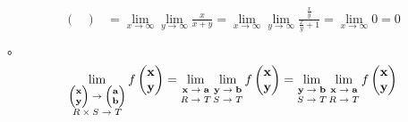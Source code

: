 \documentclass[dvipdfmx]{jsarticle}
\begin{document}
\begin{thm}
{\begin{align*}
\begin{pmatrix}
  \end{pmatrix} &= \lim_{x\rightarrow \infty } \lim_{y\rightarrow \infty } \frac{x}{x+y} = \lim_{x\rightarrow \infty } \lim_{y\rightarrow \infty } \frac{\frac{x}{y}}{\frac{x}{y}+1} = \lim_{x\rightarrow \infty } 0 =0 \\
\end{align*}}。
\begin{align*}
\lim_{\scriptsize \begin{matrix} \begin{pmatrix}
\mathbf{x} \\
\mathbf{y} \\
\end{pmatrix} \rightarrow \begin{pmatrix}
\mathbf{a} \\
\mathbf{b} \\
\end{pmatrix} \\ R \times S \rightarrow T \end{matrix}}{f\begin{pmatrix}
\mathbf{x} \\
\mathbf{y} \\
\end{pmatrix}} = \lim_{\scriptsize \begin{matrix} \mathbf{x} \rightarrow \mathbf{a} \\ R \rightarrow T \end{matrix}}{\lim_{\scriptsize \begin{matrix} \mathbf{y} \rightarrow \mathbf{b} \\ S \rightarrow T \end{matrix}}{f\begin{pmatrix}
\mathbf{x} \\
\mathbf{y} \\
\end{pmatrix}}} = \lim_{\scriptsize \begin{matrix} \mathbf{y} \rightarrow \mathbf{b} \\ S \rightarrow T \end{matrix}}{\lim_{\scriptsize \begin{matrix} \mathbf{x} \rightarrow \mathbf{a} \\ R \rightarrow T \end{matrix}}{f\begin{pmatrix}
\mathbf{x} \\
\mathbf{y} \\
\end{pmatrix}}}
\end{align*}
\end{thm}
\end{document}
